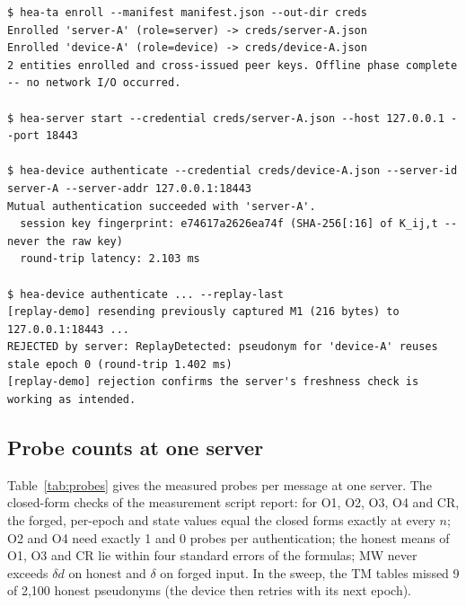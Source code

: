 \par\noindent\begin{minipage}{\linewidth}
\begin{lstlisting}[style=terminal, caption={Command-line demonstration (one machine, three terminals)}, label=lst:demo]
$ hea-ta enroll --manifest manifest.json --out-dir creds
Enrolled 'server-A' (role=server) -> creds/server-A.json
Enrolled 'device-A' (role=device) -> creds/device-A.json
2 entities enrolled and cross-issued peer keys. Offline phase complete -- no network I/O occurred.

$ hea-server start --credential creds/server-A.json --host 127.0.0.1 --port 18443

$ hea-device authenticate --credential creds/device-A.json --server-id server-A --server-addr 127.0.0.1:18443
Mutual authentication succeeded with 'server-A'.
  session key fingerprint: e74617a2626ea74f (SHA-256[:16] of K_ij,t -- never the raw key)
  round-trip latency: 2.103 ms

$ hea-device authenticate ... --replay-last
[replay-demo] resending previously captured M1 (216 bytes) to 127.0.0.1:18443 ...
REJECTED by server: ReplayDetected: pseudonym for 'device-A' reuses stale epoch 0 (round-trip 1.402 ms)
[replay-demo] rejection confirms the server's freshness check is working as intended.
\end{lstlisting}
\end{minipage}\par

\subsection*{Probe counts at one server}
Table~\ref{tab:probes} gives the measured probes per message at one server. The closed-form checks of the measurement script report: for O1, O2, O3, O4 and CR, the forged, per-epoch and state values equal the closed forms exactly at every $n$; O2 and O4 need exactly 1 and 0 probes per authentication; the honest means of O1, O3 and CR lie within four standard errors of the formulas; MW never exceeds $\delta d$ on honest and $\delta$ on forged input. In the sweep, the TM tables missed 9 of 2,100 honest pseudonyms (the device then retries with its next epoch).

